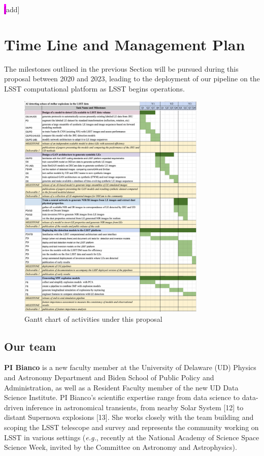 \documentclass{proposalnsf}
\newcommand{\changeit}[1]{\colorbox{magenta}{#1}}
\newcommand{\eg}{\emph{e.g.}}
\begin{document}
\changeit[add]





\section{Time Line and Management Plan}

The milestones outlined in the previous Section will be pursued during this proposal between 2020 and 2023, leading to the deployment of our pipeline on the LSST computational platform as LSST begins operations. 


\begin{figure}[htp]
    \centering
    \includegraphics[width=0.8\textwidth]{gantt}
    \caption{Gantt chart of activities under this proposal}
    \label{fig:gannt}
\end{figure}
 


\subsection{Our team}

{\bf PI Bianco} is a new faculty member at the University of Delaware (UD) Physics and Astronomy Department and Biden School of Public Policy and Administration,  as well as a Resident Faculty member of the new UD Data Science Institute. PI Bianco’s scientific expertise range from data science to data-driven inference in astronomical transients, from nearby Solar System [12] to distant Supernova explosions [13].   She works closely with the team building and scoping the LSST telescope and survey and represents the community working on LSST in various settings (\eg,  recently at the National Academy of Science Space Science Week, invited by the Committee on Astronomy and Astrophysics).  
\end{document}
